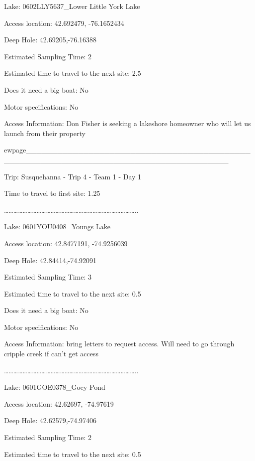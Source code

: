 \documentclass[]{article}
\begin{document}
Lake: 0602LLY5637\_Lower Little York Lake

Access location: 42.692479, -76.1652434

Deep Hole: 42.69205,-76.16388

Estimated Sampling Time: 2

Estimated time to travel to the next site: 2.5

Does it need a big boat: No

Motor specifications: No

Access Information: Don Fisher is seeking a lakeshore homeowner who will
let us launch from their property

ewpage\_\_\_\_\_\_\_\_\_\_\_\_\_\_\_\_\_\_\_\_\_\_\_\_\_\_\_\_\_\_\_\_\_\_\_\_\_\_\_\_\_\_\_\_\_\_\_\_\_\_\_\_\_\_\_\_\_\_\_\_\_\_\_\_\_\_\_\_\_\_\_\_\_\_\_\_\_\_\_\_\_\_\_\_\_\_

Trip: Susquehanna - Trip 4 - Team 1 - Day 1

Time to travel to first site: 1.25

\ldots{}\ldots{}\ldots{}\ldots{}\ldots{}\ldots{}\ldots{}\ldots{}\ldots{}\ldots{}\ldots{}\ldots{}\ldots{}\ldots{}\ldots{}\ldots{}\ldots{}\ldots{}\ldots{}\ldots{}\ldots{}\ldots{}\ldots{}\ldots{}\ldots{}\ldots{}\ldots{}\ldots{}..

Lake: 0601YOU0408\_Youngs Lake

Access location: 42.8477191, -74.9256039

Deep Hole: 42.84414,-74.92091

Estimated Sampling Time: 3

Estimated time to travel to the next site: 0.5

Does it need a big boat: No

Motor specifications: No

Access Information: bring letters to request access. Will need to go
through cripple creek if can't get access

\ldots{}\ldots{}\ldots{}\ldots{}\ldots{}\ldots{}\ldots{}\ldots{}\ldots{}\ldots{}\ldots{}\ldots{}\ldots{}\ldots{}\ldots{}\ldots{}\ldots{}\ldots{}\ldots{}\ldots{}\ldots{}\ldots{}\ldots{}\ldots{}\ldots{}\ldots{}\ldots{}\ldots{}..

Lake: 0601GOE0378\_Goey Pond

Access location: 42.62697, -74.97619

Deep Hole: 42.62579,-74.97406

Estimated Sampling Time: 2

Estimated time to travel to the next site: 0.5
\end{document}
